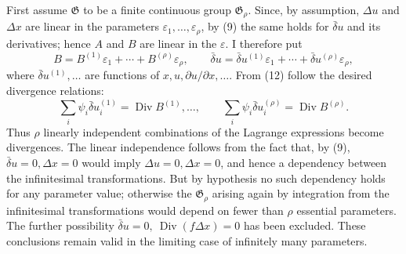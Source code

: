 \documentclass[11pt]{article}
\newcommand{\D}{\Delta}
\providecommand{\eps}{\varepsilon}
\providecommand{\Div}{\operatorname{Div}}
\providecommand{\G}{\mathfrak G}
\providecommand{\bd}{\bar{\delta}}
\providecommand{\p}{\partial}
\begin{document}
First assume \(\G\) to be a finite continuous group \(\G_\rho\). Since, by assumption, \(\D u\) and \(\D x\) are linear in the parameters \(\eps_1,\ldots,\eps_\rho\), by (9) the same holds for \(\bd u\) and its derivatives; hence \(A\) and \(B\) are linear in the \(\eps\). I therefore put
\[
B=B^{(1)}\eps_1+\cdots+B^{(\rho)}\eps_\rho,\qquad
\bd u=\bd u^{(1)}\eps_1+\cdots+\bd u^{(\rho)}\eps_\rho,
\]
where \(\bd u^{(1)},\ldots\) are functions of \(x,u,\p u/\p x,\ldots\). From (12) follow the desired divergence relations:
\begin{equation}
\sum_i\psi_i\bd u_i^{(1)}=\Div B^{(1)},\ldots,\qquad
\sum_i\psi_i\bd u_i^{(\rho)}=\Div B^{(\rho)}.
\tag{13}
\end{equation}
Thus \(\rho\) linearly independent combinations of the Lagrange expressions become divergences. The linear independence follows from the fact that, by (9), \(\bd u=0,\D x=0\) would imply \(\D u=0,\D x=0\), and hence a dependency between the infinitesimal transformations. But by hypothesis no such dependency holds for any parameter value; otherwise the \(\G_\rho\) arising again by integration from the infinitesimal transformations would depend on fewer than \(\rho\) essential parameters. The further possibility \(\bd u=0,\ \Div(f\D x)=0\) has been excluded. These conclusions remain valid in the limiting case of infinitely many parameters.
\end{document}
